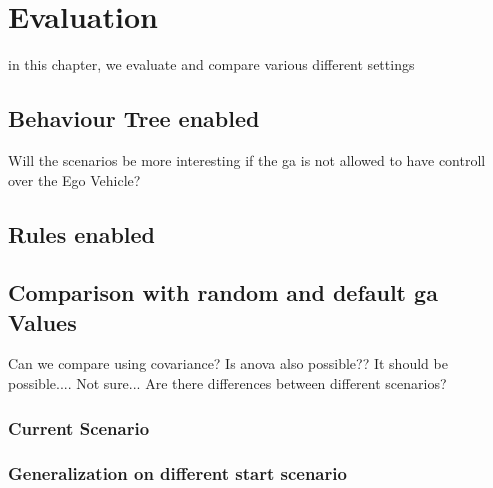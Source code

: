 \chapter{Evaluation}
\label{chap:evaluation}
in this chapter, we evaluate and compare various different settings



\section{Behaviour Tree enabled}
Will the scenarios be more interesting if the ga is not allowed to have controll over the Ego Vehicle?

\section{Rules enabled}

\section{Comparison with random and default ga Values}


Can we compare using covariance? Is anova also possible?? It should be possible.... Not sure...
Are there differences between different scenarios? 
\subsection{Current Scenario}

\subsection{Generalization on different start scenario}
